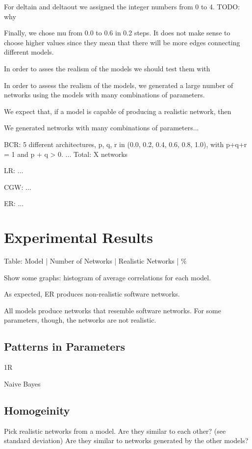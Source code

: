 For deltain and deltaout we assigned the integer numbers from 0 to 4. TODO: why

Finally, we chose mu from 0.0 to 0.6 in 0.2 steps. It does not make sense to
choose higher values since they mean that there will be more edges connecting
different models.


In order to asses the realism of the models we should test them with 

In order to assess the realism of the models, we generated a large number of
networks using the models with many combinations of parameters. 

We expect that,
if a model is capable of producing a realistic network, then 

We generated networks with many combinations of parameters...

BCR: 5 different architectures, 
p, q, r in (0.0, 0.2, 0.4, 0.6, 0.8, 1.0), with p+q+r = 1 and p + q > 0.
...
Total: X networks

LR: ...

CGW: ...

ER: ...

\section{Experimental Results}

Table: Model | Number of Networks | Realistic Networks | \%

Show some graphs: histogram of average correlations for each model.

As expected, ER produces non-realistic software networks.

All models produce networks that resemble software networks.  For some
parameters, though, the networks are not realistic.

\subsection{Patterns in Parameters}

1R

Naive Bayes

\subsection{Homogeinity}

Pick realistic networks from a model. Are they similar to each other? (see
standard deviation) Are they similar to networks generated by the other models?

